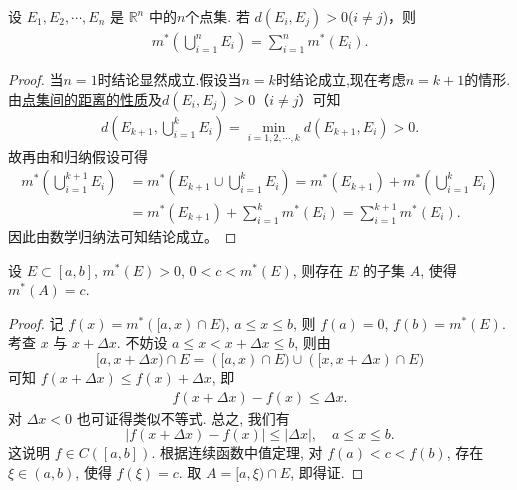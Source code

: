 \documentclass[../../main.tex]{subfiles}
\begin{document}
\begin{corollary}\label{corollary:距离大于零的两个点集的外测度满足可数可加性}
设 \(E_1, E_2,\cdots,E_n\) 是 \(\mathbb{R}^n\) 中的$n$个点集. 若 \(d(E_i, E_j)>0\)($i\ne j$)，则
\begin{align*}
m^*\left( \bigcup_{i=1}^n{E_i} \right) =\sum_{i=1}^n{m^*\left( E_i \right)}.
\end{align*}
\end{corollary}
\begin{proof}
当$n=1$时结论显然成立.假设当$n=k$时结论成立,现在考虑$n=k+1$的情形.由\hyperref[proposition:点集间的距离的性质]{点集间的距离的性质}及$d(E_i,E_j)>0$（$i\neq j$）可知
\begin{align*}
d\left(E_{k + 1},\bigcup_{i = 1}^kE_i\right)=\min_{i = 1,2,\cdots,k}d\left(E_{k + 1},E_i\right)>0.
\end{align*}
故再由和归纳假设可得
\begin{align*}
m^*\left(\bigcup_{i = 1}^{k + 1}E_i\right)&=m^*\left(E_{k + 1}\cup\bigcup_{i = 1}^kE_i\right)=m^*\left(E_{k + 1}\right)+m^*\left(\bigcup_{i = 1}^kE_i\right)\\
&=m^*\left(E_{k + 1}\right)+\sum_{i = 1}^km^*(E_i)
=\sum_{i = 1}^{k + 1}m^*(E_i).
\end{align*}
因此由数学归纳法可知结论成立。 

\end{proof}

\begin{proposition}\label{proposition:Lebesgue外测度的内介值性}
设 \(E \subset [a,b]\), \(m^*(E)>0\), \(0 < c < m^*(E)\), 则存在 \(E\) 的子集 \(A\), 使得 \(m^*(A)=c\).
\end{proposition}
\begin{proof}
记 \(f(x)=m^*([a,x) \cap E)\), \(a \leqslant  x \leqslant  b\), 则 \(f(a)=0\), \(f(b)=m^*(E)\). 考查 \(x\) 与 \(x + \Delta x\). 不妨设 \(a \leqslant  x < x + \Delta x \leqslant  b\), 则由
\[
[a,x + \Delta x) \cap E = ([a,x) \cap E) \cup ([x,x + \Delta x) \cap E)
\]
可知 \(f(x + \Delta x) \leqslant  f(x) + \Delta x\), 即
\begin{align*}
f(x + \Delta x) - f(x) \leqslant  \Delta x.
\end{align*}
对 \(\Delta x < 0\) 也可证得类似不等式. 总之, 我们有
\[
|f(x + \Delta x) - f(x)| \leqslant  |\Delta x|, \quad a \leqslant  x \leqslant  b.
\]
这说明 \(f \in C([a,b])\). 根据连续函数中值定理, 对 \(f(a) < c < f(b)\), 存在 \(\xi \in (a,b)\), 使得 \(f(\xi)=c\). 取 \(A = [a,\xi) \cap E\), 即得证.

\end{proof}
\end{document}
